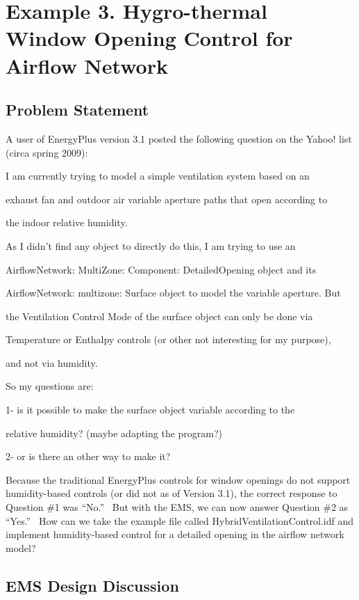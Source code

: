 \section{Example 3. Hygro-thermal Window Opening Control for Airflow Network}\label{example-3.-hygro-thermal-window-opening-control-for-airflow-network}

\subsection{Problem Statement}\label{problem-statement-005}

A user of EnergyPlus version 3.1 posted the following question on the Yahoo! list (circa spring 2009):

I am currently trying to model a simple ventilation system based on an

exhaust fan and outdoor air variable aperture paths that open according to

the indoor relative humidity.

As I didn't find any object to directly do this, I am trying to use an

AirflowNetwork: MultiZone: Component: DetailedOpening object and its

AirflowNetwork: multizone: Surface object to model the variable aperture. But

the Ventilation Control Mode of the surface object can only be done via

Temperature or Enthalpy controls (or other not interesting for my purpose),

and not via humidity.

So my questions are:

1- is it possible to make the surface object variable according to the

relative humidity? (maybe adapting the program?)

2- or is there an other way to make it?

Because the traditional EnergyPlus controls for window openings do not support humidity-based controls (or did not as of Version 3.1), the correct response to Question \#1 was ``No.''~ But with the EMS, we can now answer Question \#2 as ``Yes.''~ How can we take the example file called HybridVentilationControl.idf and implement humidity-based control for a detailed opening in the airflow network model?

\subsection{EMS Design Discussion}\label{ems-design-discussion-005}

